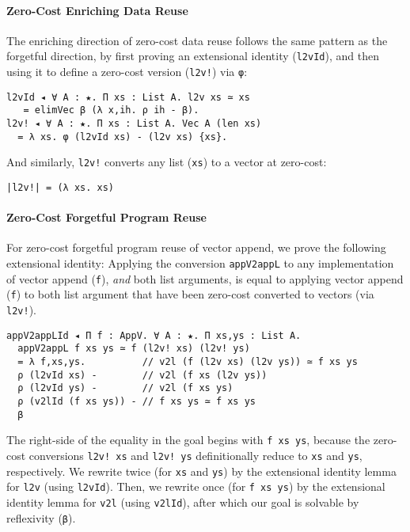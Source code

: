 \documentclass[acmsmall]{acmart}\settopmatter{}
\begin{document}
\paragraph{Zero-Cost Enriching Data Reuse}

The enriching direction of zero-cost data reuse follows the same
pattern as the forgetful direction, by first proving an extensional identity
(\verb;l2vId;), and then using it to define a zero-cost version
(\verb;l2v!;) via \verb;φ;:
\begin{verbatim}
l2vId ◂ ∀ A : ★. Π xs : List A. l2v xs ≃ xs
   = elimVec β (λ x,ih. ρ ih - β).
l2v! ◂ ∀ A : ★. Π xs : List A. Vec A (len xs)
  = λ xs. φ (l2vId xs) - (l2v xs) {xs}.
\end{verbatim}
And similarly, \verb;l2v!; converts any list (\verb;xs;)
to a vector at zero-cost:
\begin{verbatim}
|l2v!| = (λ xs. xs)
\end{verbatim}

\paragraph{Zero-Cost Forgetful Program Reuse}

For zero-cost forgetful program reuse of vector append, we prove
the following extensional identity:
Applying the conversion \verb;appV2appL; to any implementation of
vector append (\verb;f;), \textit{and} both list arguments, is equal
to applying vector append (\verb;f;) to both list argument that have been
zero-cost converted to vectors (via \verb;l2v!;).
\begin{verbatim}
appV2appLId ◂ Π f : AppV. ∀ A : ★. Π xs,ys : List A. 
  appV2appL f xs ys ≃ f (l2v! xs) (l2v! ys)
  = λ f,xs,ys.          // v2l (f (l2v xs) (l2v ys)) ≃ f xs ys
  ρ (l2vId xs) -        // v2l (f xs (l2v ys))
  ρ (l2vId ys) -        // v2l (f xs ys)
  ρ (v2lId (f xs ys)) - // f xs ys ≃ f xs ys
  β
\end{verbatim}
The right-side of the equality in the goal begins with
\verb;f xs ys;, because the zero-cost conversions \verb;l2v! xs; and
\verb;l2v! ys; definitionally reduce to \verb;xs; and \verb;ys;,
respectively. We rewrite twice (for \verb;xs; and \verb;ys;)
by the extensional identity lemma for \verb;l2v; (using \verb;l2vId;).
Then, we rewrite once (for \verb;f xs ys;) by the extensional identity
lemma for \verb;v2l; (using \verb;v2lId;), after which our goal is
solvable by reflexivity (\verb;β;).
\end{document}
